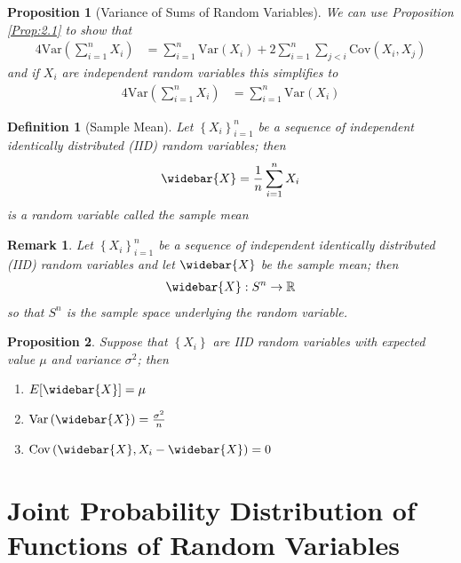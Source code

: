 \documentclass[11pt, oneside]{book}   	%
\newtheorem{definition}{Definition}[chapter]
\newtheorem{remark}{Remark}[chapter]
\newtheorem{proposition}{Proposition}[chapter]
\newcommand{\set}[1]{\left\{#1\right\}}
\newcommand{\var}[1]{\mathrm{Var}\left(#1\right)}
\newcommand{\cov}[1]{\mathrm{Cov}\left(#1\right)}
\begin{document}
\begin{proposition}[Variance of Sums of Random Variables]
	We can use Proposition \ref{Prop:2.1} to show that 
	\begin{alignat}{4}
		\var{\sum_{i=1}^n X_i}&=\sum_{i=1}^n\var{X_i}+2\sum_{i=1}^n\sum_{j<i}\cov{X_i, X_j}
	\end{alignat}
	and if $X_i$ are independent random variables this simplifies to 
	\begin{alignat}{4}
		\var{\sum_{i=1}^n X_i}&=\sum_{i=1}^n\var{X_i}
	\end{alignat}
\end{proposition}

\begin{definition}[Sample Mean]
	Let $\set{X_i}_{i=1}^n$ be a sequence of independent identically distributed \emph{(IID)} random variables; then 
	\begin{alignat}{4}
		\widebar{X}=\frac{1}{n}\sum_{i=1}^n X_i
	\end{alignat}
	is a random variable called the \emph{sample mean}
\end{definition}

\begin{remark}
	Let $\set{X_i}_{i=1}^n$ be a sequence of independent identically distributed \emph{(IID)} random variables and let $\widebar{X}$ be the sample mean; then 
	\begin{alignat}{4}
		\widebar{X}:S^n\to \mathbb{R}
	\end{alignat}
	so that $S^n$ is the sample space underlying the random variable. 
\end{remark}

\begin{proposition}
	Suppose that $\set{X_i}$ are IID random variables with expected value $\mu$ and variance $\sigma^2$; then 
	\begin{enumerate}
		\item $E[\widebar{X}] = \mu$ 
		\item $\var{\widebar{X}} = \frac{\sigma^2}{n}$
		\item $\cov{\widebar{X}, X_i-\widebar{X}} = 0$
	\end{enumerate}
\end{proposition}

\section{Joint Probability Distribution of Functions of Random Variables}
\end{document}
